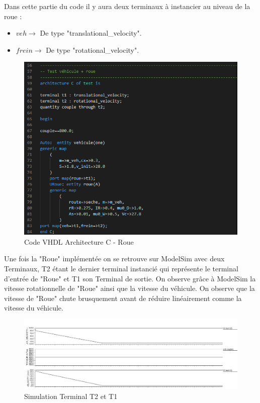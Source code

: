 Dans cette partie du code il y aura deux terminaux à instancier au niveau de la roue :\\

\begin{itemize}
    \item $veh  \rightarrow $ De type "translational\_velocity".
    \item $frein    \rightarrow $ De type "rotational\_velocity".
\end{itemize}

\begin{figure}[h]
    \centering
    \includegraphics[width=\textwidth]{images/Roue.png}
    \caption{Code VHDL Architecture C - Roue}
\end{figure}

\newpage

Une fois la "Roue" implémentée on se retrouve sur ModelSim avec deux Terminaux, T2 étant le dernier terminal instancié qui représente le terminal d'entrée de "Roue" et T1 son Terminal de sortie. On observe grâce à ModelSim la vitesse rotationnelle de "Roue" ainsi que la vitesse du véhicule. On observe que la vitesse de "Roue" chute brusquement avant de réduire linéairement comme la vitesse du véhicule.

\begin{figure}[h]
    \centering
    \includegraphics[width=1.1\textwidth]{images/Instanciation_roue.jpg}
    \caption{Simulation Terminal T2 et T1}
\end{figure}

